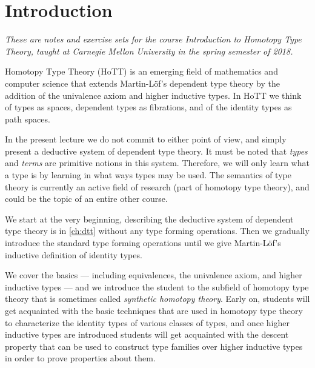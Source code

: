 \chapter{Introduction}

\emph{These are notes and exercise sets for the course Introduction to Homotopy Type Theory, taught at Carnegie Mellon University in the spring semester of 2018.} 

\bigskip
\noindent Homotopy Type Theory (HoTT) is an emerging field of mathematics and computer science that extends Martin-Löf's dependent type theory by the addition of the univalence axiom and higher inductive types. In HoTT we think of types as spaces, dependent types as fibrations, and of the identity types as path spaces.

\begin{figure}

\end{figure}

In the present lecture we do not commit to either point of view, and simply present a deductive system of dependent type theory. It must be noted that \emph{types} and \emph{terms} are primitive notions in this system. Therefore, we will only learn what a type is by learning in what ways types may be used. The semantics of type theory is currently an active field of research (part of homotopy type theory), and could be the topic of an entire other course.

We start at the very beginning, describing the deductive system of dependent type theory is in \cref{ch:dtt} without any type forming operations. Then we gradually introduce the standard type forming operations until we give Martin-L\"of's inductive definition of identity types. 

We cover the basics --- including equivalences, the univalence axiom, and higher inductive types --- and we introduce the student to the subfield of homotopy type theory that is sometimes called \emph{synthetic homotopy theory}. Early on, students will get acquainted with the basic techniques that are used in homotopy type theory to characterize the identity types of various classes of types, and once higher inductive types are introduced students will get acquainted with the descent property that can be used to construct type families over higher inductive types in order to prove properties about them.

